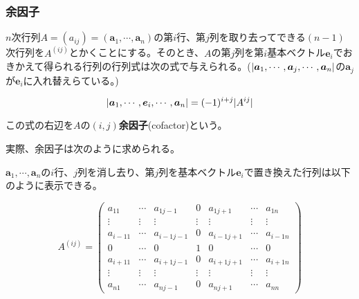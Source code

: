 \documentclass[dvipdfmx,autodetect-engine]{jsarticle}
\DeclarePairedDelimiter{\abs}{\lvert}{\rvert}
\begin{document}


\subsubsection{余因子}

$n$次行列$A = (a_{ij}) = (\bm{a}_1, \cdots, \bm{a}_n)$の第$i$行、第$j$列を取り去ってできる$(n - 1)$次行列を$A^{(ij)}$とかくことにする。そのとき、$A$の第$j$列を第$i$基本ベクトル$\bm{e}_i$でおきかえて得られる行列の行列式は次の式で与えられる。($\abs{\bm{a}_1, \cdots, \bm{a}_j, \cdots, \bm{a}_n}$の$\bm{a}_j$が$\bm{e}_i$に入れ替えらている。)

\begin{equation}
\abs{\bm{a}_1, \cdots, \bm{e}_i, \cdots, \bm{a}_n} = (-1)^{i+j}\abs{A^{ij}}
\label{defi:cofactor}
\end{equation}


この式の右辺を$A$の$(i,j)${\bf 余因子}(cofactor)という。

実際、余因子は次のように求められる。

$\bm{a}_1, \cdots, \bm{a}_n$の$i$行、$j$列を消し去り、第$j$列を基本ベクトル$\bm{e}_i$で置き換えた行列は以下のように表示できる。


$$
A^{(ij)} = \begin{pmatrix*}
a_{11} & \cdots & a_{1{j-1}} & 0 & a_{1{j+1}} & \cdots & a_{1n} \\
\vdots & \vdots & \vdots & \vdots & \vdots & \vdots & \vdots \\
a_{{i-1}1} & \cdots & a_{{i-1}{j-1}} & 0 & a_{{i-1}{j+1}} & \cdots & a_{{i-1}n} \\
0 & \cdots & 0 & 1 & 0 & \cdots & 0 \\
a_{{i+1}1} & \cdots & a_{{i+1}{j-1}} & 0 & a_{{i+1}{j+1}} & \cdots & a_{{i+1}n} \\
\vdots & \vdots & \vdots & \vdots & \vdots & \vdots & \vdots \\
a_{n1} & \cdots & a_{n{j-1}} & 0 & a_{n{j+1}} & \cdots & a_{nn}
\end{pmatrix*}
$$
\end{document}
